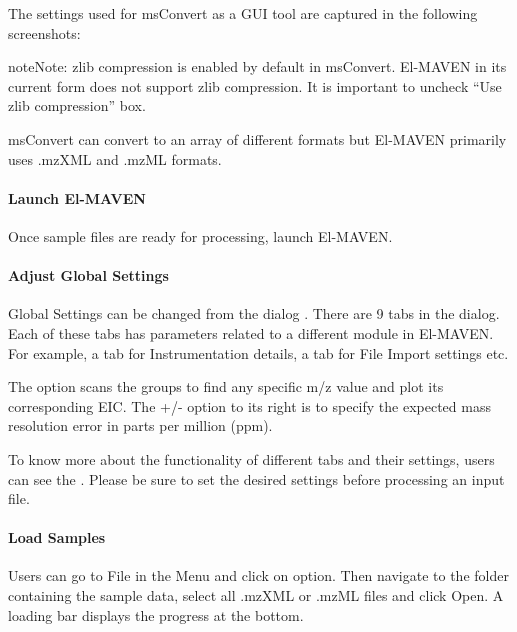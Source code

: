 \documentclass[letterpaper,10pt,english,openany,oneside]{sphinxmanual}
\begin{document}
The settings used for msConvert as a GUI tool are captured in the following screenshots:


\begin{sphinxadmonition}{note}{Note:}
zlib compression is enabled by default in msConvert. El-MAVEN in its current form does not support zlib compression. It is important to uncheck “Use zlib compression” box.
\end{sphinxadmonition}


msConvert can convert to an array of different formats but El-MAVEN primarily uses .mzXML and .mzML formats.


\paragraph{Launch El-MAVEN}
\label{\detokenize{LabeledLCMSWorkflow:launch-el-maven}}
Once sample files are ready for processing, launch El-MAVEN.



\paragraph{Adjust Global Settings}
\label{\detokenize{LabeledLCMSWorkflow:adjust-global-settings}}
Global Settings can be changed from the  dialog . There are 9 tabs in the dialog. Each of these tabs has parameters related to a different module in El-MAVEN. For example, a tab for Instrumentation details, a tab for File Import settings etc.


The  option scans the groups to find any specific m/z value and plot its corresponding EIC. The +/- option to its right is to specify the expected mass resolution error in parts per million (ppm).


To know more about the functionality of different tabs and their settings, users can see the . Please be sure to set the desired settings before processing an input file.


\paragraph{Load Samples}
\label{\detokenize{LabeledLCMSWorkflow:load-samples}}
Users can go to File in the Menu and click on  option. Then navigate to the folder containing the sample data, select all .mzXML or .mzML files and click Open. A loading bar displays the progress at the bottom.
\end{document}
